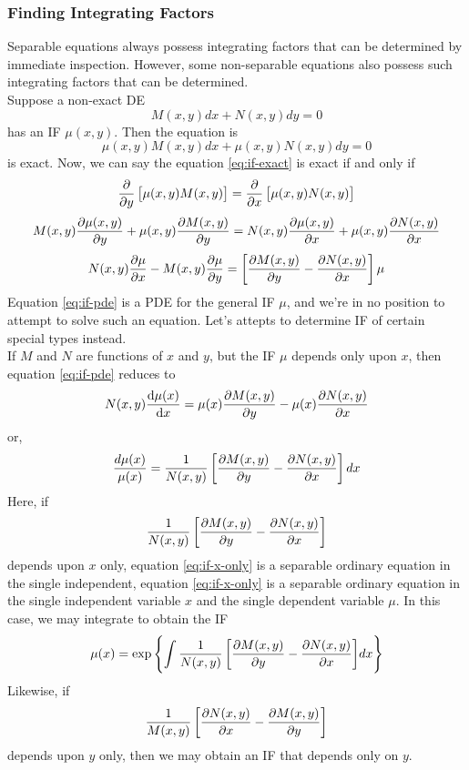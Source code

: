 \vspace{20pt}
\subsubsection{Finding Integrating Factors}

Separable equations always possess integrating factors that can be determined by immediate inspection. However, some non-separable equations also possess such integrating factors that can be determined.\\

Suppose a non-exact DE
\begin{equation}
    \label{eq:if-nonexact}
    M(x,y) d{x} + N(x,y) d{y} = 0
\end{equation}
has an IF $\mu(x,y)$. Then the equation is
\begin{equation}
    \label{eq:if-exact}
    \mu(x,y)M(x,y) d{x} + \mu(x,y)N(x,y) d{y} = 0
\end{equation}
is exact. Now, we can say the equation \eqref{eq:if-exact} is exact if and only if \[
    \pdv{}{y} \left[ \mu(x,y)M(x,y) \right] = \pdv{}{x} \left[ \mu(x,y)N(x,y) \right]
\]\[
    M(x,y)\pdv{\mu(x,y)}{y} + \mu(x,y)\pdv{M(x,y)}{y} = N(x,y)\pdv{\mu(x,y)}{x} + \mu(x,y)\pdv{N(x,y)}{x} 
\]
\begin{equation}
    \label{eq:if-pde}
    N(x,y)\pdv{\mu}{x} - M(x,y)\pdv{\mu}{y} = \left[ \pdv{M(x,y)}{y} - \pdv{N(x,y)}{x} \right] \mu
\end{equation}
Equation \eqref{eq:if-pde} is a PDE for the general IF $\mu$, and we're in no position to attempt to solve such an equation. Let's attepts to determine IF of certain special types instead.\\
If $M$ and $N$ are functions of $x$ and $y$, but the IF $\mu$ depends only upon $x$, then equation \eqref{eq:if-pde} reduces to
\[
    N(x,y) \dv{\mu(x)}{x} = \mu(x) \pdv{M(x,y)}{y} - \mu(x) \pdv{N(x,y)}{x}
\] or,
    \begin{equation}
        \label{eq:if-x-only}
        \frac{d\mu(x)}{\mu(x)} = \frac{1}{N(x,y)} \left[ \pdv{M(x,y)}{y} - \pdv{N(x,y)}{x} \right] d{x}
    \end{equation}
Here, if \[
    \frac{1}{N(x,y)} \left[ \pdv{M(x,y)}{y} - \pdv{N(x,y)}{x} \right]  
\]
depends upon $x$ only, equation \eqref{eq:if-x-only} is a separable ordinary equation in the single independent, equation \eqref{eq:if-x-only} is a separable ordinary equation in the single independent variable $x$ and the single dependent variable $\mu$. In this case, we may integrate to obtain the IF
\[
    \mu(x) = \exp \left\{ \int{ \frac{1}{N(x,y)} \left[ \pdv{M(x,y)}{y} - \pdv{N(x,y)}{x} \right] } d{x} \right\}
\]
Likewise, if
\[
    \frac{1}{M(x,y)} \left[ \pdv{N(x,y)}{x} - \pdv{M(x,y)}{y} \right]
\] depends upon $y$ only, then we may obtain an IF that depends only on $y$.


